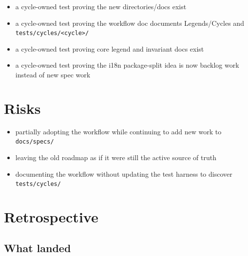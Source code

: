 \begin{itemize}
\tightlist
\item
  a cycle-owned test proving the new directories/docs exist
\item
  a cycle-owned test proving the workflow doc documents Legends/Cycles and \texttt{t\allowbreak{}e\allowbreak{}s\allowbreak{}t\allowbreak{}s\allowbreak{}/\allowbreak{}c\allowbreak{}y\allowbreak{}c\allowbreak{}l\allowbreak{}e\allowbreak{}s\allowbreak{}/\allowbreak{}<\allowbreak{}c\allowbreak{}y\allowbreak{}c\allowbreak{}l\allowbreak{}e\allowbreak{}>\allowbreak{}/}
\item
  a cycle-owned test proving core legend and invariant docs exist
\item
  a cycle-owned test proving the i18n package-split idea is now backlog work instead of new spec work
\end{itemize}

\section{Risks}\label{record-200-risks}

\begin{itemize}
\tightlist
\item
  partially adopting the workflow while continuing to add new work to \texttt{d\allowbreak{}o\allowbreak{}c\allowbreak{}s\allowbreak{}/\allowbreak{}s\allowbreak{}p\allowbreak{}e\allowbreak{}c\allowbreak{}s\allowbreak{}/}
\item
  leaving the old roadmap as if it were still the active source of truth
\item
  documenting the workflow without updating the test harness to discover \texttt{t\allowbreak{}e\allowbreak{}s\allowbreak{}t\allowbreak{}s\allowbreak{}/\allowbreak{}c\allowbreak{}y\allowbreak{}c\allowbreak{}l\allowbreak{}e\allowbreak{}s\allowbreak{}/}
\end{itemize}

\section{Retrospective}\label{record-200-retrospective}

\subsection{What landed}\label{record-200-what-landed}

